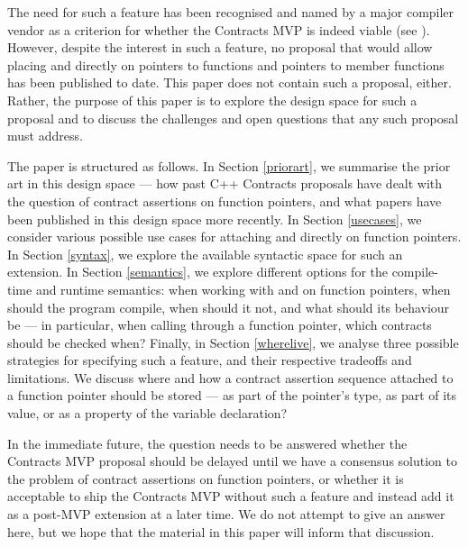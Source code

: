 The need for such a feature has been recognised and named by a major compiler vendor as a criterion for whether the Contracts MVP is indeed viable (see \cite{P3173R0}). However, despite the interest in such a feature, no proposal that would allow placing  and  directly on pointers to functions and pointers to member functions has been published to date. This paper does not contain such a proposal, either. Rather, the purpose of this paper is to explore the design space for such a proposal and to discuss the challenges and open questions that any such proposal must address.

The paper is structured as follows. In Section \ref{priorart}, we summarise the prior art in this design space --- how past C++ Contracts proposals have dealt with the question of contract assertions on function pointers, and what papers have been published in this design space more recently. In Section \ref{usecases}, we consider various possible use cases for attaching  and  directly on function pointers. In Section \ref{syntax}, we explore the available syntactic space for such an extension. In Section \ref{semantics}, we explore different options for the compile-time and runtime semantics: when working with  and  on function pointers, when should the program compile, when should it not, and what should its behaviour be --- in particular, when calling through a function pointer, which contracts should be checked when? Finally, in Section \ref{wherelive}, we analyse three possible strategies for specifying such a feature, and their respective tradeoffs and limitations. We discuss where and how a contract assertion sequence attached to a function pointer should be stored --- as part of the pointer's type, as part of its value, or as a property of the variable declaration?

In the immediate future, the question needs to be answered whether the Contracts MVP proposal \cite{P2900R8} should be delayed until we have a consensus solution to the problem of contract assertions on function pointers, or whether it is acceptable to ship the Contracts MVP without such a feature and instead add it as a post-MVP extension at a later time. We do not attempt to give an answer here, but we hope that the material in this paper will inform that discussion.


